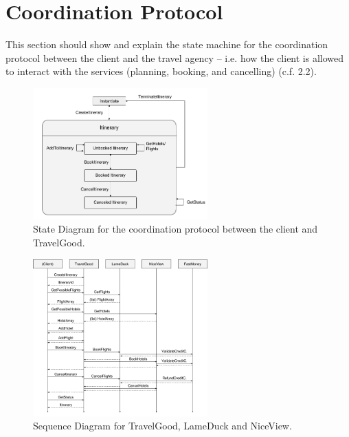 \section{Coordination Protocol}

This section should show and explain the state machine for the coordination protocol between the client and the travel agency – i.e. how the client is allowed to interact with the services (planning, booking, and cancelling) (c.f. 2.2).

\begin{figure}[H]
\centering
\includegraphics[width=0.6\textwidth]{images/StateDiagram}
\caption{State Diagram for the coordination protocol between the client and TravelGood.}
\label{statediagram}
\end{figure}

\begin{figure}[H]
\centering
\includegraphics[width=0.6\textwidth]{images/SequenceDiagram}
\caption{Sequence Diagram for TravelGood, LameDuck and NiceView.}
\label{statediagram}
\end{figure}
